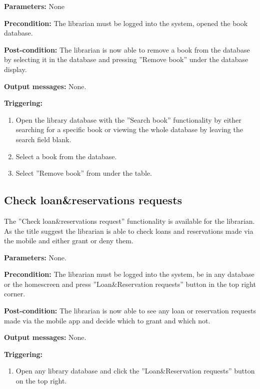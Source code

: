 \begin{description}

\item \textbf{Parameters:} None

\item \textbf{Precondition:} The librarian must be logged into the system,
opened the book database.

\item \textbf{Post-condition:} The librarian is now able to remove a book from
the database by selecting it in the database and pressing ''Remove book''
under the database display.

\item \textbf{Output messages:} None.

\item \textbf{Triggering:}
\begin{enumerate}
\item Open the library database with the ''Search book'' functionality by
either searching for a specific book or viewing the whole database by leaving
the search field blank.
\item Select a book from the database.
\item Select ''Remove book'' from under the table.
\end{enumerate}

\end{description}

\subsection{Check loan\&reservations requests}

The ''Check loan\&reservations request'' functionality is available for the
librarian.
As the title suggest the librarian is able to check loans and reservations made
via the mobile and either grant or deny them.

\begin{description}

\item \textbf{Parameters:} None.

\item \textbf{Precondition:} The librarian must be logged into the system, be in
any database or the homescreen and press ''Loan\&Reservation requests'' button
in the top right corner.

\item \textbf{Post-condition:} The librarian is now able to see any loan or
reservation requests made via the mobile app and decide which to grant and which
not.

\item \textbf{Output messages:} None.

\item \textbf{Triggering:}
\begin{enumerate}
\item Open any library database and click the ''Loan\&Reservation requests''
button on the top right.
\end{enumerate}

\end{description}

